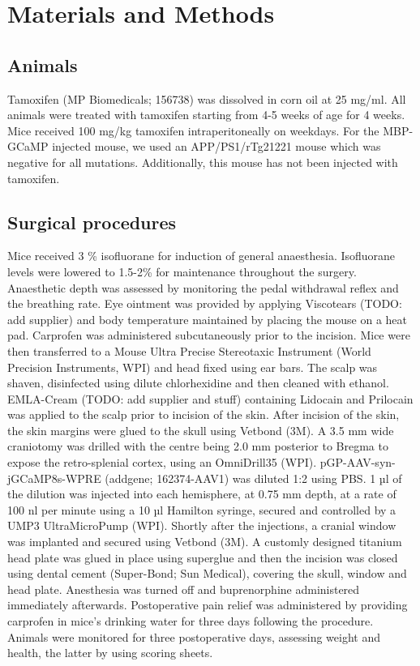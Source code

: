 \chapter{Materials and Methods}
\label{ch:2-methods}

\minitoc

\section{Animals}
Tamoxifen (MP Biomedicals; 156738) was dissolved in corn oil at 25 mg/ml. All animals were treated with tamoxifen starting from 4-5 weeks of age for 4 weeks. Mice received 100 mg/kg tamoxifen intraperitoneally on weekdays.
For the MBP-GCaMP injected mouse, we used an APP/PS1/rTg21221 mouse which was negative for all mutations. Additionally, this mouse has not been injected with tamoxifen.
\section{Surgical procedures}
Mice received 3 \% isofluorane for induction of general anaesthesia. Isofluorane levels were lowered to 1.5-2\% for maintenance throughout the surgery. Anaesthetic depth was assessed by monitoring the pedal withdrawal reflex and the breathing rate. Eye ointment was provided by applying Viscotears (TODO: add supplier) and body temperature maintained by placing the mouse on a heat pad. Carprofen was administered subcutaneously prior to the incision. Mice were then transferred to a Mouse Ultra Precise Stereotaxic Instrument (World Precision Instruments, WPI) and head fixed using ear bars. The scalp was shaven, disinfected using dilute chlorhexidine and then cleaned with ethanol.  EMLA-Cream (TODO: add supplier and stuff) containing Lidocain and Prilocain was applied to the scalp prior to incision of the skin. After incision of the skin, the skin margins were glued to the skull using Vetbond (3M).
A 3.5 mm wide craniotomy was drilled  with the centre being 2.0 mm posterior to Bregma to expose the retro-splenial cortex, using an OmniDrill35 (WPI).
pGP-AAV-syn-jGCaMP8s-WPRE (addgene; 162374-AAV1) was diluted 1:2 using PBS. 1 µl of the dilution was injected into each hemisphere, at 0.75 mm depth, at a rate of 100 nl per minute using a 10 µl Hamilton syringe, secured and controlled by a UMP3 UltraMicroPump (WPI).
Shortly after the injections, a cranial window was implanted and secured using Vetbond (3M). A customly designed titanium head plate was glued in place using superglue and then the incision was closed using dental cement (Super-Bond; Sun Medical), covering the skull, window and head plate.
Anesthesia was turned off and buprenorphine administered immediately afterwards. Postoperative pain relief was administered by providing carprofen in mice's drinking water for three days following the procedure. Animals were monitored for three postoperative days, assessing weight and health, the latter by using scoring sheets.
